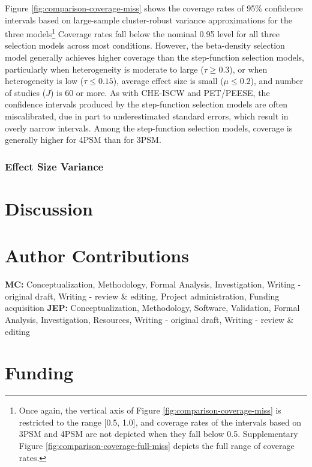 \documentclass[
  american,
  man, donotrepeattitle,floatsintext]{apa7}
\begin{document}
Figure \ref{fig:comparison-coverage-miss} shows the coverage rates of 95\% confidence intervals based on large-sample cluster-robust variance approximations for the three models\footnote{Once again, the vertical axis of Figure \ref{fig:comparison-coverage-miss} is restricted to the range {[}0.5, 1.0{]}, and coverage rates of the intervals based on 3PSM and 4PSM are not depicted when they fall below 0.5. Supplementary Figure \ref{fig:comparison-coverage-full-miss} depicts the full range of coverage rates.}
Coverage rates fall below the nominal 0.95 level for all three selection models across most conditions. However, the beta-density selection model generally achieves higher coverage than the step-function selection models, particularly when heterogeneity is moderate to large (\(\tau \geq 0.3\)), or when heterogeneity is low (\(\tau \leq 0.15\)), average effect size is small (\(\mu \leq 0.2\)), and number of studies (\(J\)) is 60 or more. As with CHE-ISCW and PET/PEESE, the confidence intervals produced by the step-function selection models are often miscalibrated, due in part to underestimated standard errors, which result in overly narrow intervals. Among the step-function selection models, coverage is generally higher for 4PSM than for 3PSM.

\subsubsection{Effect Size Variance}\label{effect-size-variance}

\section{Discussion}\label{discussion}

\section*{Author Contributions}\label{author-contributions}

\textbf{MC:} Conceptualization, Methodology, Formal Analysis, Investigation, Writing - original draft, Writing - review \& editing, Project administration, Funding acquisition \textbf{JEP:} Conceptualization, Methodology, Software, Validation, Formal Analysis, Investigation, Resources, Writing - original draft, Writing - review \& editing

\section*{Funding}\label{funding}
\end{document}
